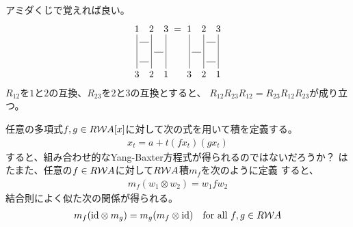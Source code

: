 {	\begin{note}\label{note:Yang-Baxter式の覚え方} %
		アミダくじで覚えれば良い。
		\begin{equation*}\begin{split}
			\xymatrix@R=1ex@C=1ex{
				1 \ar@{-}[dddd] & 2 \ar@{-}[dddd] & 3 \ar@{-}[dddd] \\
				\ar@{-}[r] & \\
				& \ar@{-}[r] & \\
				\ar@{-}[r] & \\
				3 & 2 & 1 \\
			} = \xymatrix@R=1ex@C=1ex{
				1 \ar@{-}[dddd] & 2 \ar@{-}[dddd] & 3 \ar@{-}[dddd] \\
				& \ar@{-}[r] & \\
				\ar@{-}[r] & \\
				& \ar@{-}[r] & \\
				3 & 2 & 1 \\
			}
		\end{split}\end{equation*}
		$R_{12}$を$1$と$2$の互換、$R_{23}$を$2$と$3$の互換とすると、
		$R_{12}R_{23}R_{12}=R_{23}R_{12}R_{23}$が成り立つ。
	\end{note} %

	\begin{note}\label{note:Yang-Baxterとの関連} %
		任意の多項式$f,g\in R{{\mathcal{W}}} A[x]$に対して次の式を用いて積を定義する。
		\begin{equation*}\begin{split}
			x_t = a + t(fx_t)(gx_t)
		\end{split}\end{equation*}
		すると、組み合わせ的なYang-Baxter方程式が得られるのではないだろうか？
		はたまた、任意の$f\in R{{\mathcal{W}}} A$に対して$R{{\mathcal{W}}} A$積$m_f$を次のように定義
		すると、
		\begin{equation*}\begin{split}
			m_f(w_1\otimes w_2) = w_1fw_2
		\end{split}\end{equation*}
		結合則によく似た次の関係が得られる。
		\begin{equation*}\begin{split}
			m_f({\operatorname{id}}\otimes m_g) = m_g(m_f\otimes{\ensuremath{\operatorname{id}}})
			\quad\text{for all } f,g\in R{{\mathcal{W}}} A
		\end{split}\end{equation*}
	\end{note} %

}
